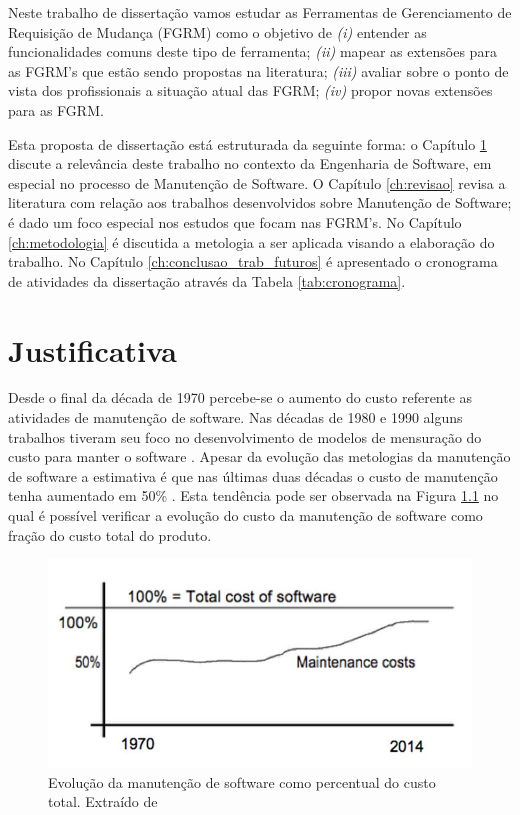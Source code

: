 \documentclass[msc,proposal,hidelot,hideabstract]{ppgccufmg} %
\begin{document}
Neste trabalho de dissertação vamos estudar as Ferramentas de Gerenciamento de Requisição de Mudança (FGRM) como o objetivo de \textit{(i)} entender as funcionalidades comuns deste tipo de ferramenta; \textit{(ii)} mapear as extensões para as FGRM's que estão sendo propostas na literatura; \textit{(iii)} avaliar sobre o ponto de vista dos profissionais a situação atual das FGRM; \textit{(iv)} propor novas extensões para as FGRM.
	
Esta proposta de dissertação está estruturada da seguinte forma: o  Capítulo
\ref{ch:justificativa} discute a relevância deste trabalho no contexto da Engenharia de Software, em especial no processo de Manutenção de Software. O Capítulo \ref{ch:revisao} revisa a literatura com relação aos trabalhos desenvolvidos sobre Manutenção de Software; é dado um foco especial
nos estudos que focam nas FGRM's. No Capítulo \ref{ch:metodologia} é discutida a metologia a ser aplicada visando a elaboração do trabalho. No Capítulo \ref{ch:conclusao_trab_futuros} é apresentado o cronograma de atividades da dissertação através da Tabela \ref{tab:cronograma}.

\chapter{Justificativa}
\label{ch:justificativa}
Desde o final da década de 1970 \cite{Zelkowitz:1979:PSE:578504} percebe-se o aumento do custo referente as atividades de  manutenção de software. Nas décadas de 1980 e 1990 alguns
trabalhos tiveram seu foco no desenvolvimento de modelos de mensuração do custo
para manter o software \cite{Herrin:1985:SMC:323287.323383,hirota1994approach}. Apesar da evolução das metologias da manutenção de software a estimativa é que nas últimas duas décadas o custo de manutenção tenha aumentado em 50\% \cite{koskinen2010software}. Esta tendência pode ser observada na Figura \ref{fig:software-maintence-costs} no qual é possível verificar a evolução do custo da manutenção de software como fração do custo total do produto.

\begin{figure}
\centering
\includegraphics[width=0.7\linewidth]{../img/software-maintence-costs}
\caption{Evolução da manutenção de software como percentual do custo total.	Extraído de	\cite{engelbertink2010save}}

\label{fig:software-maintence-costs}
\end{figure}
\end{document}
